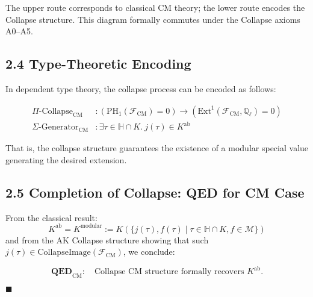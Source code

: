 \documentclass[11pt]{article}
\begin{document}
\begin{center}
\end{center}

The upper route corresponds to classical CM theory; the lower route encodes the Collapse structure. This diagram formally commutes under the Collapse axioms A0–A5.

\subsection{2.4 Type-Theoretic Encoding}

In dependent type theory, the collapse process can be encoded as follows:

\begin{align*}
\Pi\text{-Collapse}_{\mathrm{CM}} &: \left(\mathrm{PH}_1(\mathcal{F}_{\mathrm{CM}}) = 0 \right) \rightarrow \left(\mathrm{Ext}^1(\mathcal{F}_{\mathrm{CM}}, \mathbb{Q}_\ell) = 0 \right) \\
\Sigma\text{-Generator}_{\mathrm{CM}} &: \exists \tau \in \mathbb{H} \cap K.\ j(\tau) \in K^{\mathrm{ab}}
\end{align*}

That is, the collapse structure guarantees the existence of a modular special value generating the desired extension.

\subsection{2.5 Completion of Collapse: QED for CM Case}

From the classical result:
\[
K^{\mathrm{ab}} = K^{\text{modular}} := K(\{ j(\tau), f(\tau) \mid \tau \in \mathbb{H} \cap K, f \in \mathcal{M} \})
\]
and from the AK Collapse structure showing that such \( j(\tau) \in \text{CollapseImage}(\mathcal{F}_{\mathrm{CM}}) \),  
we conclude:

\[
\textbf{QED}_{\mathrm{CM}}: \quad \text{Collapse CM structure formally recovers } K^{\mathrm{ab}}.
\]

\hfill $\blacksquare$
\end{document}
